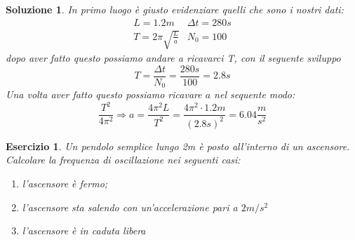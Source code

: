 \documentclass{article}
\newtheorem{es}{Esercizio}[section]
\newtheorem{sol}{Soluzione}[section]
\begin{document}
\begin{sol}
  In primo luogo è giusto evidenziare quelli che sono i nostri dati:
  \begin{equation*}
    \begin{matrix}
      L=1.2m & \Delta t=280s\\
      T=2\pi \sqrt{\frac{L}{a}}& N_0=100
    \end{matrix}
  \end{equation*}
  dopo aver fatto questo possiamo andare a ricavarci T, con il seguente sviluppo
  \begin{equation*}
    T=\frac{\Delta t}{N_0}=\frac{280s}{100}=2.8s
  \end{equation*}
  Una volta aver fatto questo possiamo ricavare $a$ nel sequente modo:
  \begin{equation*}
    \frac{T^2}{4\pi^2}\Rightarrow{} a=\frac{4\pi^2L}{T^2}=\frac{4\pi^2\cdot1.2m}{(2.8s)^2}=6.04\frac{m}{s^2}
  \end{equation*}
\end{sol}
\begin{es}
  Un pendolo semplice lungo 2m è posto all'interno di un ascensore. Calcolare la frequenza di oscillazione nei seguenti casi:
  \begin{enumerate}
  \item l'ascensore è fermo;
  \item l'ascensore sta salendo con un'accelerazione pari a $2m/s^2$
  \item l'ascensore è in caduta libera
  \end{enumerate}
\end{es}
\end{document}
